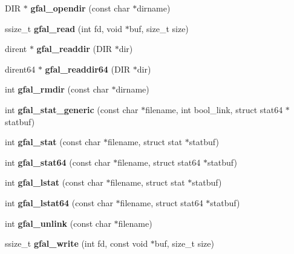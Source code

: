 \begin{CompactItemize}
\item 
DIR $\ast$ \textbf{gfal\_\-opendir} (const char $\ast$dirname)\label{group__posix__group_g004ad5efbd544da820823e597e57be92}

\item 
ssize\_\-t \textbf{gfal\_\-read} (int fd, void $\ast$buf, size\_\-t size)\label{group__posix__group_gaa6bfe36f33b86e489b798aed96912de}

\item 
dirent $\ast$ \textbf{gfal\_\-readdir} (DIR $\ast$dir)\label{group__posix__group_g2a8ed205f7748d7817a18521268a1f2d}

\item 
dirent64 $\ast$ \textbf{gfal\_\-readdir64} (DIR $\ast$dir)\label{gfal__posix_8c_ad202b2730efde51021b620bce0d1683}

\item 
int \textbf{gfal\_\-rmdir} (const char $\ast$dirname)\label{group__posix__group_gcc4b6347640a722674c2d6df437490df}

\item 
int \textbf{gfal\_\-stat\_\-generic} (const char $\ast$filename, int bool\_\-link, struct stat64 $\ast$statbuf)\label{gfal__posix_8c_678840d435b1b1a34645fa21d34e1102}

\item 
int \textbf{gfal\_\-stat} (const char $\ast$filename, struct stat $\ast$statbuf)\label{group__posix__group_g1d8c86d522d5dd26ee7ddcd9c6925964}

\item 
int \textbf{gfal\_\-stat64} (const char $\ast$filename, struct stat64 $\ast$statbuf)\label{group__posix__group_gb40e2d23618763284ab4a1fb1a06a880}

\item 
int \textbf{gfal\_\-lstat} (const char $\ast$filename, struct stat $\ast$statbuf)\label{group__posix__group_g347f867802a33bc04fdfb769da857103}

\item 
int \textbf{gfal\_\-lstat64} (const char $\ast$filename, struct stat64 $\ast$statbuf)\label{group__posix__group_g739ca4985a67e0fc4fc253f42df2638c}

\item 
int \textbf{gfal\_\-unlink} (const char $\ast$filename)\label{group__posix__group_gdeb4c6cc47f507da3e3b498374e308fb}

\item 
ssize\_\-t \textbf{gfal\_\-write} (int fd, const void $\ast$buf, size\_\-t size)\label{group__posix__group_g00c2d64894ae81c05846b06c84727ae9}


\end{CompactItemize}
